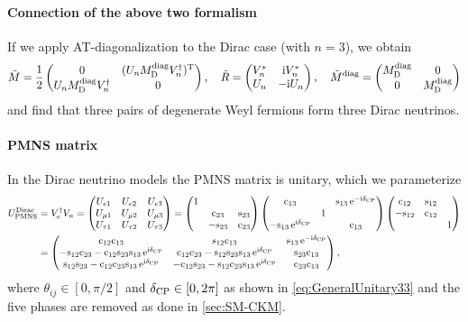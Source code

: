 \documentclass[CheatSheet]{subfiles}
\newcommand\MD[1][]{M_{\mathrm{D}#1}}
\begin{document}
\paragraph{Connection of the above two formalism}
If we apply AT-diagonalization to the Dirac case (with $n=3$), we obtain
\begin{align}
\tilde M = \frac12\pmat{0 & (U_n\MD\wdiag V_n^\dagger)^\TT \\ U_n\MD\wdiag V_n^\dagger & 0},\quad
  \tilde R=\pmat{V_n^* & \ii V_n^* \\ U_n & -\ii U_n},\quad
  \tilde M\wdiag=\pmat{\MD\wdiag & 0 \\ 0 & \MD\wdiag}
\end{align}
and find that three pairs of degenerate Weyl fermions form three Dirac neutrinos. 


\paragraph{PMNS matrix}\label{sec:PMNS}
In the Dirac neutrino models the PMNS matrix is unitary, which we parameterize
\begin{equation}
\begin{split}
   U_{\mathrm{PMNS}}^{\text{Dirac}}&=V_e^\dagger V_n
 =\begin{pmatrix}
 U_{e1} & U_{e2} & U_{e3}\\
 U_{\mu1} & U_{\mu2} & U_{\mu3}\\
 U_{\tau1} & U_{\tau2} & U_{\tau3}
 \end{pmatrix}
 =
 \begin{pmatrix}1&&\\&\mathrm{c}_{23}&\mathrm{s}_{23}\\&-\mathrm{s}_{23}&\mathrm{c}_{23}\end{pmatrix}
 \begin{pmatrix}\mathrm{c}_{13}&&\mathrm{s}_{13}\mathop{}\!\mathrm{e}^{-\mathrm{i}\delta_{\mathrm{CP}}}\\&1&\\-\mathrm{s}_{13}\mathop{}\!\mathrm{e}^{\mathrm{i}\delta_{\mathrm{CP}}}&&\mathrm{c}_{13}\end{pmatrix}
 \begin{pmatrix}\mathrm{c}_{12}&\mathrm{s}_{12}&\\-\mathrm{s}_{12}&\mathrm{c}_{12}&\\&&1\end{pmatrix}
 \\&=
 \begin{pmatrix}
 \mathrm{c}_{12} \mathrm{c}_{13} & \mathrm{s}_{12} \mathrm{c}_{13} & \mathrm{s}_{13} \mathop{}\!\mathrm{e}^{-\mathrm{i}\delta_{\mathrm{CP}}}\\
 -\mathrm{s}_{12} \mathrm{c}_{23} - \mathrm{c}_{12} \mathrm{s}_{23} \mathrm{s}_{13} \mathop{}\!\mathrm{e}^{\mathrm{i}\delta_{\mathrm{CP}}}& \mathrm{c}_{12} \mathrm{c}_{23} - \mathrm{s}_{12}\mathrm{s}_{23}\mathrm{s}_{13} \mathop{}\!\mathrm{e}^{\mathrm{i}\delta_{\mathrm{CP}}}& \mathrm{s}_{23}\mathrm{c}_{13}\\
  \mathrm{s}_{12}\mathrm{s}_{23} - \mathrm{c}_{12} \mathrm{c}_{23} \mathrm{s}_{13}\mathop{}\!\mathrm{e}^{\mathrm{i}\delta_{\mathrm{CP}}} & -\mathrm{c}_{12}\mathrm{s}_{23}-\mathrm{s}_{12}\mathrm{c}_{23}\mathrm{s}_{13}\mathop{}\!\mathrm{e}^{\mathrm{i}\delta_{\mathrm{CP}}} & \mathrm{c}_{23} \mathrm{c}_{13}
\end{pmatrix},
\end{split}
\end{equation}
where $\theta_{ij}\in[0,\pi/2]$ and $\delta_{\mathrm{CP}}\in[0,2\pi]$ as shown in \cref{eq:GeneralUnitary33} and the five phases are removed as done in \cref{sec:SM-CKM}.
\end{document}
